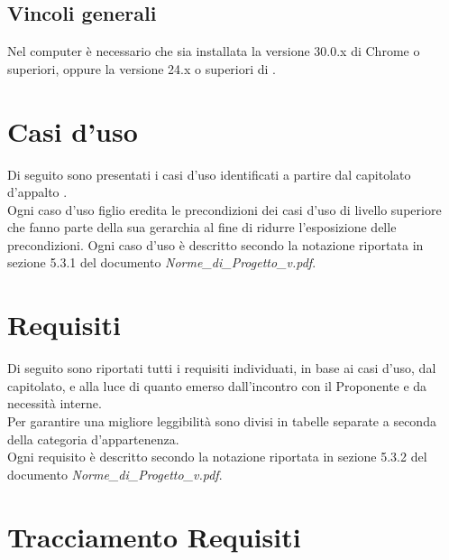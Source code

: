 \subsection{Vincoli generali}
Nel computer è necessario che sia installata la versione 30.0.x di  Chrome o superiori, oppure la versione 24.x o superiori di .

\newpage
\section{Casi d'uso} %
Di seguito sono presentati i casi d'uso identificati a partire dal capitolato d'appalto \Progetto. \\
Ogni caso d'uso figlio eredita le precondizioni dei casi d'uso di livello superiore che fanno parte della sua gerarchia al fine di ridurre l'esposizione delle precondizioni.
Ogni caso d'uso è descritto secondo la notazione riportata in sezione 5.3.1 del documento \emph{Norme\_{}di\_{}Progetto\_{}v\versioneNormeDiProgetto{}.pdf}.




\newpage


\newpage


\newpage
\section{Requisiti} %
Di seguito sono riportati tutti i requisiti individuati, in base ai casi d'uso, dal capitolato, e alla luce di quanto emerso dall'incontro con il Proponente e da necessità interne.\\
Per garantire una migliore leggibilità sono divisi in tabelle separate a seconda della categoria d'appartenenza.\\
Ogni requisito è descritto secondo la notazione riportata in sezione 5.3.2 del documento \emph{Norme\_{}di\_{}Progetto\_{}v\versioneNormeDiProgetto{}.pdf}.



\newpage
\section{Tracciamento Requisiti}



